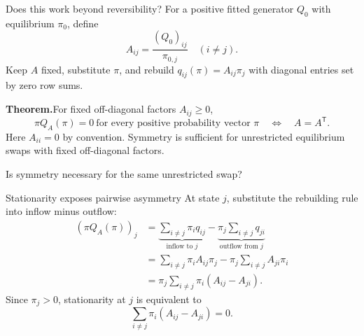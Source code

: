 \documentclass[aspectratio=169,11pt]{beamer}
\begin{document}
\begin{frame}{Does this work beyond reversibility?}
For a positive fitted generator $Q_0$ with equilibrium $\pi_0$, define
\[
 A_{ij}=\frac{(Q_0)_{ij}}{\pi_{0,j}}\quad(i\ne j).
\]
Keep $A$ fixed, substitute $\pi$, and rebuild $q_{ij}(\pi)=A_{ij}\pi_j$
with diagonal entries set by zero row sums.

\vspace{1mm}
\textbf{Theorem.}\hspace{2mm}For fixed off-diagonal factors $A_{ij}\ge0$,
\[
 \boxed{\pi Q_A(\pi)=0\ \text{for every positive probability vector }\pi
 \quad\Longleftrightarrow\quad A=A^{\mathsf T}.}
\]
Here $A_{ii}=0$ by convention. Symmetry is sufficient for unrestricted
equilibrium swaps with fixed off-diagonal factors.

\alert{Is symmetry necessary for the same unrestricted swap?}
\end{frame}

\begin{frame}{Stationarity exposes pairwise asymmetry}
At state $j$, substitute the rebuilding rule into inflow minus outflow:
\begin{align*}
 (\pi Q_A(\pi))_j
 &=\underbrace{\sum_{i\ne j}\pi_iq_{ij}}_{\text{inflow to }j}
   -\underbrace{\pi_j\sum_{i\ne j}q_{ji}}_{\text{outflow from }j}\\[2mm]
 &=\sum_{i\ne j}\pi_iA_{ij}\pi_j
   -\pi_j\sum_{i\ne j}A_{ji}\pi_i\\[2mm]
 &=\pi_j\sum_{i\ne j}\pi_i(A_{ij}-A_{ji}).
\end{align*}
Since $\pi_j>0$, stationarity at $j$ is equivalent to
\[
 \boxed{\sum_{i\ne j}\pi_i(A_{ij}-A_{ji})=0.}
\]
\end{frame}
\end{document}
